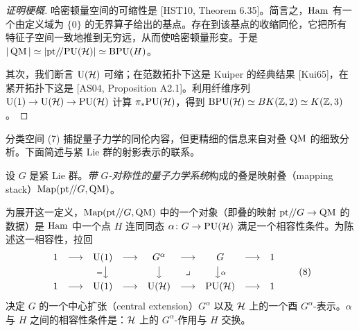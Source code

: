 \begin{proof}[证明梗概]
哈密顿量空间的可缩性是 [HST10, Theorem 6.35]。简言之，$\operatorname{Ham}$ 有一个由定义域为 $\{0\}$ 的无界算子给出的基点。存在到该基点的收缩同伦，它把所有特征子空间一致地推到无穷远，从而使哈密顿量形变。于是 $|\operatorname{QM}|\simeq|\mathrm{pt}/\!/\mathrm{PU}(\mathcal{H})|\simeq\operatorname{BPU}(H)$。

其次，我们断言 $\mathrm{U}(\mathcal{H})$ 可缩；在范数拓扑下这是 Kuiper 的经典结果 [Kui65]，在紧开拓扑下这是 [AS04, Proposition A2.1]。利用纤维序列 $\mathrm{U}(1)\to\mathrm{U}(\mathcal{H})\to\mathrm{PU}(\mathcal{H})$ 计算 $\pi_*\mathrm{PU}(\mathcal{H})$，得到 $\operatorname{BPU}(\mathcal{H})\simeq BK(\mathbb{Z},2)\simeq K(\mathbb{Z},3)$。
\end{proof}

分类空间 (7) 捕捉量子力学的同伦内容，但更精细的信息来自对叠 $\operatorname{QM}$ 的细致分析。下面简述与紧 Lie 群的射影表示的联系。

\begin{definition}[2.8]
设 $G$ 是紧 Lie 群。\emph{带 $G$-对称性的量子力学系统}构成的叠是映射叠（mapping stack）$\mathrm{Map}(\mathrm{pt}/\!/G,\operatorname{QM})$。
\end{definition}

为展开这一定义，$\mathrm{Map}(\mathrm{pt}/\!/G,\operatorname{QM})$ 中的一个对象（即叠的映射 $\mathrm{pt}/\!/G\to\operatorname{QM}$ 的数据）是 $\operatorname{Ham}$ 中一个点 $H$ 连同同态 $\alpha\colon G\to\mathrm{PU}(\mathcal{H})$
满足一个相容性条件。为陈述这一相容性，拉回
\begin{equation}
\begin{array}{ccccccccc}
1 & \longrightarrow & \mathrm{U}(1) & \longrightarrow & G^{\alpha} & \longrightarrow & G & \longrightarrow & 1\\[3pt]
 & & {\scriptstyle=}\big\downarrow & & \big\downarrow & \lrcorner & \big\downarrow{\scriptstyle\alpha} & & \\[3pt]
1 & \longrightarrow & \mathrm{U}(1) & \longrightarrow & \mathrm{U}(\mathcal{H}) & \longrightarrow & \mathrm{PU}(\mathcal{H}) & \longrightarrow & 1
\end{array}
\tag{8}
\end{equation}
决定 $G$ 的一个中心扩张（central extension）$G^{\alpha}$ 以及 $\mathcal{H}$ 上的一个酉 $G^{\alpha}$-表示。$\alpha$ 与 $H$ 之间的相容性条件是：$\mathcal{H}$ 上的 $G^{\alpha}$-作用与 $H$ 交换。

